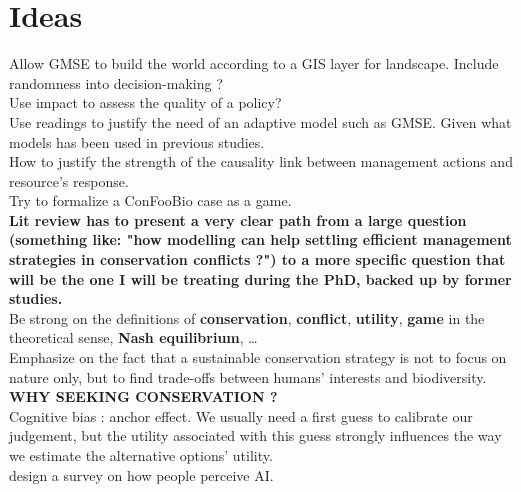 \documentclass[12pt]{article}
\begin{document}
\section*{Ideas}
Allow GMSE to build the world according to a GIS layer for landscape.
Include randomness into decision-making ?\\
Use impact to assess the quality of a policy?\\
Use readings to justify the need of an adaptive model such as GMSE. Given what models has been used in previous studies.\\
How to justify the strength of the causality link between management actions and resource's response.\\
Try to formalize a ConFooBio case as a game.\\
\textbf{Lit review has to present a very clear path from a large question (something like: "how modelling can help settling efficient management strategies in conservation conflicts ?") to a more specific question that will be the one I will be treating during the PhD, backed up by former studies.}\\
Be strong on the definitions of \textbf{conservation}, \textbf{conflict}, \textbf{utility}, \textbf{game} in the theoretical sense, \textbf{Nash equilibrium}, \dots\\
Emphasize on the fact that a sustainable conservation strategy is not to focus on nature only, but to find trade-offs between humans' interests and biodiversity.\\
\textbf{WHY SEEKING CONSERVATION ?}\\
Cognitive bias : anchor effect. We usually need a first guess to calibrate our judgement, but the utility associated with this guess strongly influences the way we estimate the alternative options' utility.\\
design a survey on how people perceive AI.
\end{document}
